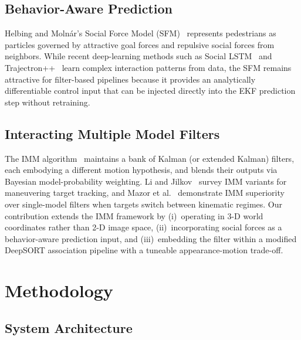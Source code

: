 \documentclass[conference]{IEEEtran}
\begin{document}
\subsection{Behavior-Aware Prediction}
Helbing and Moln\'{a}r's Social Force Model (SFM)~\cite{helbing1995social} represents pedestrians as particles governed by attractive goal forces and repulsive social forces from neighbors. While recent deep-learning methods such as Social LSTM~\cite{alahi2016social} and Trajectron++~\cite{salzmann2020trajectron} learn complex interaction patterns from data, the SFM remains attractive for filter-based pipelines because it provides an analytically differentiable control input that can be injected directly into the EKF prediction step without retraining.

\subsection{Interacting Multiple Model Filters}
The IMM algorithm~\cite{blom1988imm, blackman1999design} maintains a bank of Kalman (or extended Kalman) filters, each embodying a different motion hypothesis, and blends their outputs via Bayesian model-probability weighting. Li and Jilkov~\cite{li2005survey} survey IMM variants for maneuvering target tracking, and Mazor et al.~\cite{mazor1998imm} demonstrate IMM superiority over single-model filters when targets switch between kinematic regimes. Our contribution extends the IMM framework by (i)~operating in 3-D world coordinates rather than 2-D image space, (ii)~incorporating social forces as a behavior-aware prediction input, and (iii)~embedding the filter within a modified DeepSORT association pipeline with a tuneable appearance-motion trade-off.

\section{Methodology}
\label{sec:method}

\subsection{System Architecture}
\label{sec:pipeline}
\end{document}
